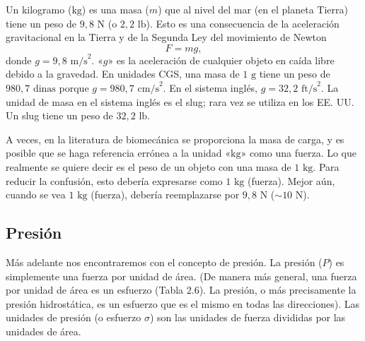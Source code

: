 \documentclass[12pt]{book}
\begin{document}
Un kilogramo ($\text{kg}$) es una masa ($m$) que al nivel del mar (en el planeta Tierra) tiene un peso de $9,8\text{ N}$ (o $2,2\text{ lb}$). Esto es una consecuencia de la aceleración gravitacional en la Tierra y de la Segunda Ley del movimiento de Newton
\begin{equation}
F = mg,
\label{eq:2.47}
\end{equation}
donde $g = 9,8\text{ m/s}^2$. «$g$» es la aceleración de cualquier objeto en caída libre debido a la gravedad. En unidades CGS, una masa de $1\text{ g}$ tiene un peso de $980,7\text{ dinas}$ porque $g = 980,7\text{ cm/s}^2$. En el sistema inglés, $g = 32,2\text{ ft/s}^2$. La unidad de masa en el sistema inglés es el slug; rara vez se utiliza en los EE. UU. Un slug tiene un peso de $32,2\text{ lb}$.

A veces, en la literatura de biomecánica se proporciona la masa de carga, y es posible que se haga referencia errónea a la unidad «$\text{kg}$» como una fuerza. Lo que realmente se quiere decir es el peso de un objeto con una masa de $1\text{ kg}$. Para reducir la confusión, esto debería expresarse como $1\text{ kg}$ (fuerza). Mejor aún, cuando se vea $1\text{ kg}$ (fuerza), debería reemplazarse por $9,8\text{ N}$ ($\sim 10\text{ N}$).

\subsection{Presión}

Más adelante nos encontraremos con el concepto de presión. La presión ($P$) es simplemente una fuerza por unidad de área. (De manera más general, una fuerza por unidad de área es un esfuerzo (Tabla 2.6). La presión, o más precisamente la presión hidrostática, es un esfuerzo que es el mismo en todas las direcciones). Las unidades de presión (o esfuerzo $\sigma$) son las unidades de fuerza divididas por las unidades de área.
\end{document}
